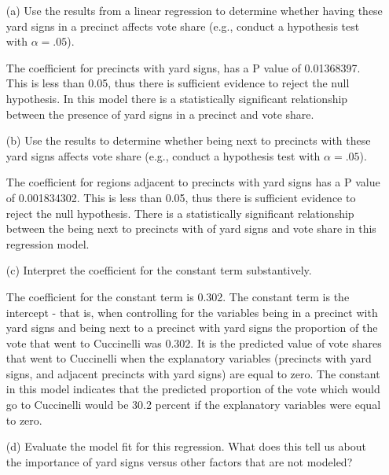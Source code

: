 \documentclass[12pt,letterpaper]{article}
\begin{document}
	\vspace{.5cm}
	\begin{enumerate}
		\item [(a)] Use the results from a linear regression to determine whether having these yard signs in a precinct affects vote share (e.g., conduct a hypothesis test with $\alpha = .05$).
			
			\text The coefficient for precincts with yard signs, has a P value of 0.01368397.  This is less than 0.05, thus there is sufficient evidence to reject the null hypothesis.  In this model there is a statistically significant relationship between the presence of yard signs in a precinct and vote share.
		\item [(b)]  Use the results to determine whether being
		next to precincts with these yard signs affects vote
		share (e.g., conduct a hypothesis test with $\alpha = .05$).
			
		\text The coefficient for regions adjacent to precincts with yard signs has a P value of 0.001834302.  This is less than 0.05, thus there is sufficient evidence to reject the null hypothesis.  There is a statistically significant relationship between the being next to precincts with of yard signs and vote share in this regression model.
		\vspace{0.25cm}
		\item [(c)] Interpret the coefficient for the constant term substantively.
		
		\text The coefficient for the constant term is 0.302.  The constant term is the intercept - that is, when controlling for the variables being in a precinct with yard signs and being next to a precinct with yard signs the proportion of the vote that went to Cuccinelli was 0.302.  It is the predicted value of vote shares that went to Cuccinelli when the explanatory variables (precincts with yard signs, and adjacent precincts with yard signs) are equal to zero.  The constant in this model indicates that the predicted proportion of the vote which would go to Cuccinelli would be 30.2 percent if the explanatory variables were equal to zero.
		\item [(d)] Evaluate the model fit for this regression.  What does this	tell us about the importance of yard signs versus other factors that are not modeled?
		

\end{enumerate}
\end{document}
